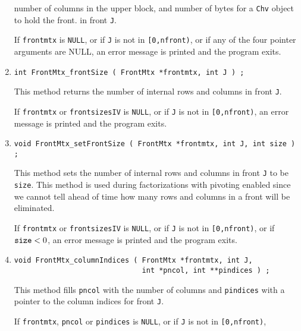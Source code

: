 \begin{enumerate}
number of columns in the upper block, and number of bytes for a
{\tt Chv} object to hold the front.
in front {\tt J}.
\par {}
If {\tt frontmtx} is {\tt NULL},
or if {\tt J} is not in {\tt [0,nfront)},
or if any of the four pointer arguments are NULL,
an error message is printed and the program exits.
\item
\begin{verbatim}
int FrontMtx_frontSize ( FrontMtx *frontmtx, int J ) ;
\end{verbatim}
This method returns the number of internal rows and columns
in front {\tt J}.
\par {}
If {\tt frontmtx} or {\tt frontsizesIV} is {\tt NULL},
or if {\tt J} is not in {\tt [0,nfront)},
an error message is printed and the program exits.
\item
\begin{verbatim}
void FrontMtx_setFrontSize ( FrontMtx *frontmtx, int J, int size ) ;
\end{verbatim}
This method sets the number of internal rows and columns
in front {\tt J} to be {\tt size}.
This method is used during factorizations with pivoting enabled
since we cannot tell ahead of time how many rows and columns in a
front will be eliminated.
\par {}
If {\tt frontmtx} or {\tt frontsizesIV} is {\tt NULL},
or if {\tt J} is not in {\tt [0,nfront)},
or if ${\tt size} < 0$,
an error message is printed and the program exits.
\item
\begin{verbatim}
void FrontMtx_columnIndices ( FrontMtx *frontmtx, int J,
                              int *pncol, int **pindices ) ;
\end{verbatim}
This method fills {\tt *pncol} with the number of columns
and {\tt *pindices} with a pointer to the column indices for front
{\tt J}.
\par {}
If {\tt frontmtx}, {\tt pncol} or {\tt pindices} is {\tt NULL},
or if {\tt J} is not in {\tt [0,nfront)},

\end{enumerate}
